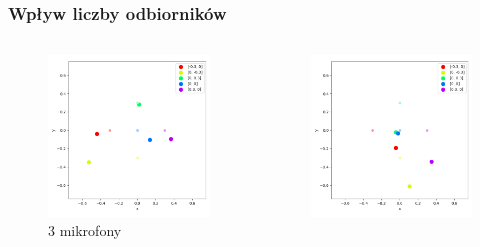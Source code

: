 \begin{frame}{}
    \frametitle{Wpływ liczby odbiorników}
    \begin{columns}
        \begin{column}{0.5\textwidth}
            \begin{figure}
                \centering
                \includegraphics[width=\textwidth]{../pics/mult_lat_2d_num/positions_3_mean.png}
                \caption{3 mikrofony}
            \end{figure}
        \end{column}
        \begin{column}{0.5\textwidth}
            \begin{figure}
                \centering
                \includegraphics[width=\textwidth]{../pics/mult_lat_2d_num/positions_4_mean.png}

\end{figure}
\end{column}
\end{columns}
\end{frame}

